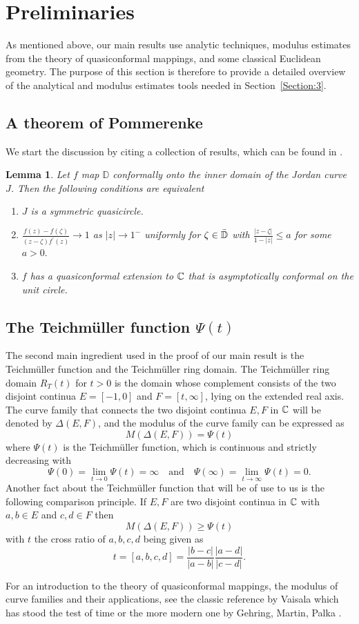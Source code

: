 \documentclass[11pt]{amsart}
\numberwithin{equation}{section}
\theoremstyle{plain}
\newtheorem{lem}{Lemma}
\theoremstyle{step}
\def\leq{\leqslant}
\def\geq{\geqslant}
\newcommand{\abs}[1]{\lvert#1\rvert}
\newcommand{\D}{\mathbb{D}}
\newcommand{\Dc}{\Bar{\Bbb{D}}}
\newcommand{\C}{\Bbb{C}}
\begin{document}
\section{Preliminaries}
As mentioned above, our main results use analytic techniques, modulus estimates from the theory of quasiconformal mappings, and some classical Euclidean geometry. The purpose of this section is therefore to provide a detailed overview of the analytical and modulus estimates tools needed in Section~\ref{Section:3}.

\subsection{A theorem of Pommerenke}
We start the discussion by citing a collection of results, which can be found in \cite{pommerenke2013boundary}.
\begin{lem}\cite[Theorem 11.1]{pommerenke2013boundary}\label{lemma:pommerenke}
    Let $f$ map $\D$ conformally onto the inner domain of the Jordan curve $J$. Then the following conditions are equivalent
    \begin{enumerate}
        \item $J$ is a symmetric quasicircle.
        \item $\frac{f(z)-f(\zeta)}{(z-\zeta)f^{\prime}(z)}\to 1$ as $|z|\to1^-$ uniformly for $\zeta\in\Dc$ with $\frac{|z-\zeta|}{1-|z|}\leq a$ for some $a>0.$
        \item $f$ has a quasiconformal extension to $\C$ that is asymptotically conformal on the unit circle. 
    \end{enumerate}
\end{lem}
\subsection{The Teichm\"uller function $\Psi(t)$} 
The second main ingredient used in the proof of our main result is the Teichm\"uller function and the Teichm\"uller ring domain. The Teichm\"uller ring domain $R_{T}(t)$ for $t>0$ is the domain whose complement consists of the two disjoint continua $E=[-1,0]$ and $F=[t,\infty]$, lying on the extended real axis. The curve family that connects the two disjoint continua $E,F$ in $\C$ will be denoted by $\Delta(E,F)$, and the modulus of the curve family can be expressed as 
\[
M(\Delta(E,F))=\Psi(t)
\]
where $\Psi(t)$ is the Teichm\"uller function, which is continuous and strictly decreasing with 
\[
\Psi(0)=\lim_{t\to 0}\Psi(t)=\infty \quad {\text {and}} \quad \Psi(\infty)=\lim_{t\to \infty}\Psi(t)=0.
\]
Another fact about the Teichm\"uller function that will be of use to us is the following comparison principle. If $E,F$ are two disjoint continua in $\C$ with $a,b\in E$ and $c,d\in F$ then 
\[
M(\Delta(E,F))\geq \Psi(t)
\]
with $t$ the cross ratio of $a,b,c,d$ being given as $$t=[a,b,c,d]=\frac{\abs{b-c}}{\abs{a-b}}\frac{\abs{a-d}}{\abs{c-d}}.$$
\par
For an introduction to the theory of quasiconformal mappings, the modulus of curve families and their applications, see the classic reference by Vaisala \cite{vaisala2006lectures} which has stood the test of time or the more modern one by Gehring, Martin, Palka \cite{gehring2017introduction}.
\end{document}
